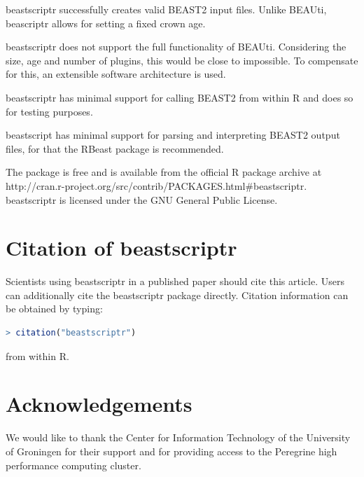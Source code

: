 \documentclass{article}
\begin{document}
beastscriptr successfully creates valid BEAST2 input files. Unlike BEAUti,
beascriptr allows for setting a fixed crown age.

beastscriptr does not support the full functionality of BEAUti. Considering
the size, age and number of plugins, this would be close to impossible.
To compensate for this, an extensible software architecture is used.

beastscriptr has minimal support for calling BEAST2 from within R and does
so for testing purposes. 

beastscript has minimal support for parsing and interpreting BEAST2 output files,
for that the RBeast package is recommended.

The package is free and is available from the official R package archive at 
http://cran.r-project.org/src/contrib/PACKAGES.html\#beastscriptr. 
beastscriptr is licensed under the GNU General Public License.


\section{Citation of beastscriptr}

Scientists using beastscriptr in a published paper should cite this
article. Users can additionally cite the beastscriptr package 
directly. Citation information can be obtained by typing:

\begin{lstlisting}[language=R]
> citation("beastscriptr")
\end{lstlisting}

from within R.

\section*{Acknowledgements}

We would like to thank the Center for Information Technology of the University of Groningen for their support
and for providing access to the Peregrine high performance computing cluster.




\begin{thebibliography}{}

\end{thebibliography}
\end{document}
